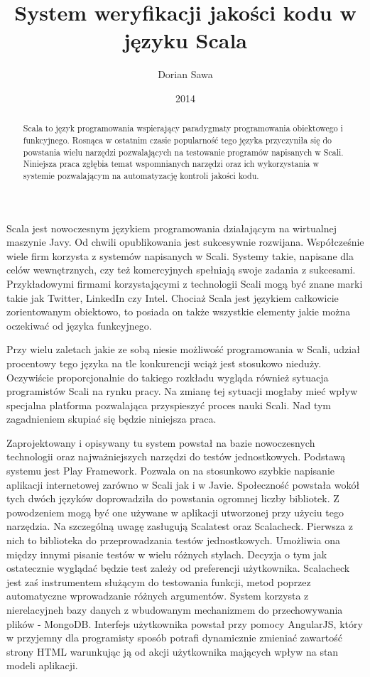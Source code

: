 \documentclass[brudnopis]{xmgr}
\author   {Dorian Sawa}
\title    {System weryfikacji jakości kodu w języku Scala}
\date     {2014}
\begin{document}
\begin{abstract}
Scala to język programowania wspierający paradygmaty programowania obiektowego i funkcyjnego. 
Rosnąca w ostatnim czasie popularność tego języka przyczyniła się do powstania wielu narzędzi pozwalających na testowanie 
programów napisanych w Scali. Niniejsza praca zgłębia temat wspomnianych narzędzi oraz ich wykorzystania w 
systemie pozwalającym na automatyzację kontroli jakości kodu.
\end{abstract}

\maketitle
%
\introduction Scala jest nowoczesnym językiem programowania działającym na wirtualnej maszynie Javy. Od chwili opublikowania jest sukcesywnie rozwijana. Współcześnie wiele firm korzysta z systemów napisanych w Scali. Systemy takie, napisane dla celów wewnętrznych, czy też komercyjnych spełniają swoje zadania z sukcesami. Przykładowymi firmami korzystającymi z technologii Scali mogą być znane marki takie jak Twitter, LinkedIn czy Intel. Chociaż Scala jest językiem całkowicie zorientowanym obiektowo, to posiada on także wszystkie elementy jakie można oczekiwać od języka funkcyjnego.

Przy wielu zaletach jakie ze sobą niesie możliwość programowania w Scali, udział procentowy tego języka na tle konkurencji wciąż jest stosukowo nieduży. Oczywiście proporcjonalnie do takiego rozkładu wygląda również sytuacja programistów Scali na rynku pracy. Na zmianę tej sytuacji mogłaby mieć wpływ specjalna platforma pozwalająca przyspieszyć proces nauki Scali. Nad tym zagadnieniem skupiać się będzie niniejsza praca.

Zaprojektowany i opisywany tu system powstał na bazie nowoczesnych technologii oraz najważniejszych narzędzi do testów jednostkowych. Podstawą systemu jest Play Framework. Pozwala on na stosunkowo szybkie napisanie aplikacji internetowej zarówno w Scali jak i w Javie. Społeczność powstała wokół tych dwóch języków doprowadziła do powstania ogromnej liczby bibliotek. Z powodzeniem mogą być one używane w aplikacji utworzonej przy użyciu tego narzędzia. 
Na szczególną uwagę zasługują Scalatest oraz Scalacheck. Pierwsza z nich to biblioteka do przeprowadzania testów jednostkowych. Umożliwia ona między innymi pisanie testów w wielu różnych stylach. Decyzja o tym jak ostatecznie wyglądać będzie test zależy od preferencji użytkownika. Scalacheck jest zaś instrumentem służącym do testowania funkcji, metod poprzez automatyczne wprowadzanie różnych argumentów. System korzysta z nierelacyjneh bazy danych z wbudowanym mechanizmem do przechowywania plików - MongoDB. Interfejs użytkownika powstał przy pomocy AngularJS, który w przyjemny dla programisty sposób  potrafi dynamicznie zmieniać zawartość strony HTML warunkując ją od akcji użytkownika mających wpływ na stan modeli aplikacji.
\end{document}
